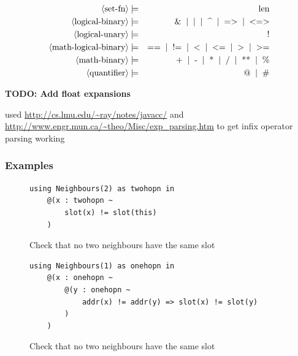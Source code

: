 \begin{eqnarray*}
	\pn{set-fn} & \pp & \sm{len} \\
%
	\pn{logical-binary} & \pp & \sm{\&}  \oo \sm{\textbar} \oo \sm{\textasciicircum} \oo \sm{=\textgreater} \oo \sm{\textless=\textgreater} \\
	\pn{logical-unary} & \pp & \sm{!} \\
	\pn{math-logical-binary} & \pp & \sm{==} \oo \sm{!=} \oo \sm{\textless} \oo \sm{\textless=} \oo \sm{\textgreater} \oo \sm{\textgreater=} \\
	\pn{math-binary} & \pp & \sm{+} \oo \sm{-} \oo \sm{*} \oo \sm{/} \oo \sm{**} \oo \sm{\%} \\
%
%
	\pn{quantifier} & \pp & \sm{@} \oo \sm{\#} \\
\end{eqnarray*}

\textbf{TODO: Add float expansions}

used \url{http://cs.lmu.edu/~ray/notes/javacc/} and \url{http://www.engr.mun.ca/~theo/Misc/exp_parsing.htm} to get infix operator parsing working

\subsubsection{Examples}

\begin{figure}[H]
\begin{verbatim}
using Neighbours(2) as twohopn in
    @(x : twohopn ~
        slot(x) != slot(this)
    )
\end{verbatim}
\caption{Check that no two neighbours have the same slot}
\end{figure}

\begin{figure}[H]
\begin{verbatim}
using Neighbours(1) as onehopn in
    @(x : onehopn ~
        @(y : onehopn ~
            addr(x) != addr(y) => slot(x) != slot(y)
        )
    )
\end{verbatim}
\caption{Check that no two neighbours have the same slot \cite{DBLP:journals/corr/abs-0808-0920}}
\end{figure}

